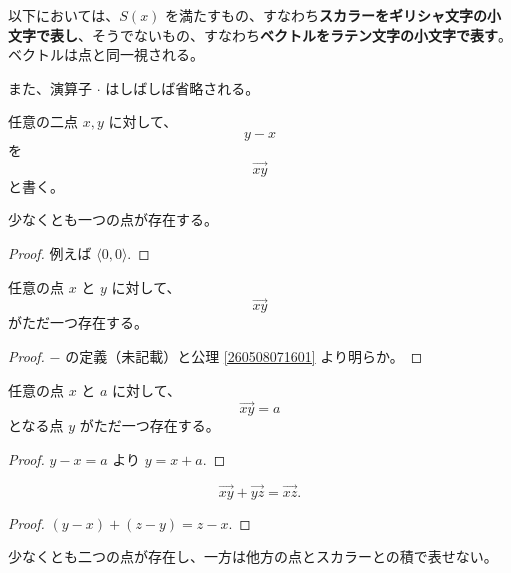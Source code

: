 以下においては、\(S(x)\) を満たすもの、すなわち\textbf{スカラーをギリシャ文字の小文字で表し}、そうでないもの、すなわち\textbf{ベクトルをラテン文字の小文字で表す}。
ベクトルは点と同一視される。

また、演算子 \(\cdot\) はしばしば省略される。


\begin{dfn}
  任意の二点 \(x,y\) に対して、
  \[y-x\]
  を
  \[\overrightarrow{xy}\]
  と書く。
\end{dfn}


\begin{thm}
  少なくとも一つの点が存在する。
\end{thm}

\begin{proof}
  例えば \(\langle0,0\rangle.\)
\end{proof}


\begin{thm}
  任意の点 \(x\) と \(y\) に対して、
  \[\overrightarrow{xy}\]
  がただ一つ存在する。
\end{thm}

\begin{proof}
  \(-\) の定義（未記載）と公理 \ref{260508071601} より明らか。
\end{proof}


\begin{thm}\label{260527103901}
  任意の点 \(x\) と \(a\) に対して、
  \[\overrightarrow{xy}=a\]
  となる点 \(y\) がただ一つ存在する。
\end{thm}

\begin{proof}
  \(y-x=a\) より \(y=x+a.\)
\end{proof}


\begin{thm}
  \[\overrightarrow{xy}+\overrightarrow{yz}=\overrightarrow{xz}.\]
\end{thm}

\begin{proof}
  \((y-x)+(z-y)=z-x.\)
\end{proof}


\begin{thm}
  少なくとも二つの点が存在し、一方は他方の点とスカラーとの積で表せない。
\end{thm}

